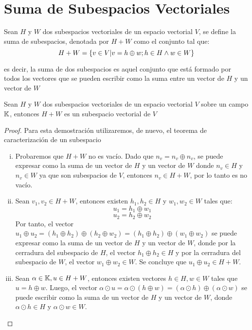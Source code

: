\newpage
\section{Suma de Subespacios Vectoriales}
\begin{dfn}
Sean $H$ y $W$ dos subespacios vectoriales de un espacio vectorial $V$, se define la suma de subespacios, denotada por $H+W$ como el conjunto tal que:
$$H+W =  \left\{v \in V | v = h\oplus w ; h \in H \land w \in W \right\} $$
\end{dfn}

es decir, la suma de dos subespacios es aquel conjunto que está formado por todos los vectores que se pueden escribir como la suma entre un vector de $H$ y un vector de $W$

\begin{theorem}
Sean $H$ y $W$ dos subespacios vectoriales de un espacio vectorial $V$ sobre un campo $\mathbb{K}$, entonces $H+W$ es un subespacio vectorial de $V$
\end{theorem}
\begin{proof}
Para esta demostración utilizaremos, de nuevo, el teorema de caracterización de un subespacio
~\\\begin{enumerate}[i.]
    \item Probaremos que $H+W$ no es vacío. Dado que $n_v = n_v \oplus n_v$, se puede expresar como la suma de un vector de $H$ y un vector de $W$ donde $n_v \in H$ y $n_v \in W$ ya que son subespacios de $V$, entonces $n_v \in H+W$, por lo tanto es no vacío.
    
    \item Sean $v_1, v_2 \in H+W$, entonces existen $h_1 , h_2 \in H$ y $w_1 , w_2 \in W$ tales que:
    $$u_1 = h_1 \oplus w_1$$ 
    $$u_2 = h_2 \oplus w_2$$
    Por tanto, el vector $u_1 \oplus u_2 = (h_1 \oplus h_2) \oplus (h_2 \oplus w_2) = (h_1 \oplus h_2) \oplus (w_1 \oplus w_2)$ se puede expresar como la suma de un vector de $H$ y un vector de $W$, donde por la cerradura del subespacio de $H$, el vector $h_1 \oplus h_2 \in H$ y por la cerradura del subespacio de $W$, el vector $w_1 \oplus w_2 \in W$. Se concluye que $u_1 \oplus u_2 \in H+W$.
    
    \item Sean $\alpha \in \mathbb{K}, u \in H+W$, entonces existen vectores $h \in H , w \in W$ tales que $u = h\oplus w$. Luego, el vector $\alpha \odot u = \alpha\odot(h\oplus w) = (\alpha \odot h) \oplus (\alpha \odot w)$ se puede escribir como la suma de un vector de $H$ y un vector de $W$, donde $\alpha \odot h \in H$ y $\alpha \odot w \in W$.
\end{enumerate}
\end{proof}


